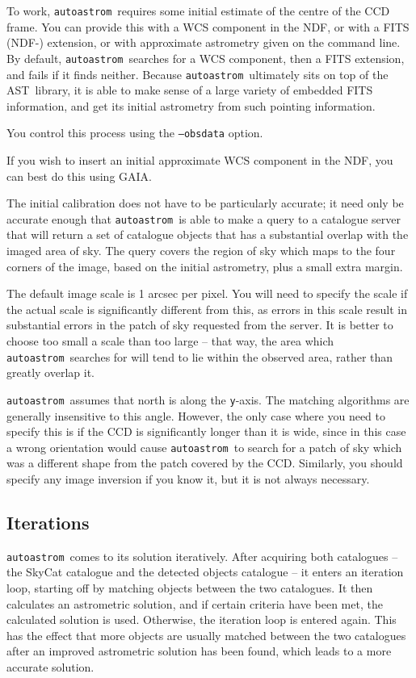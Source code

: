 \documentclass[twoside,11pt]{article}
\newcommand{\xref}[3]{#1}
\newcommand{\xlabel}[1]{}
\newcommand{\AST}{\xref{{\footnotesize AST}}{sun210}{}}
\newcommand{\autoastrom}{\texttt{autoastrom}}
\newcommand{\GAIA}{{\footnotesize GAIA}\normalsize}
\begin{document}
To work, \autoastrom\ requires some initial estimate of the centre of the CCD
frame. You can provide this with a WCS component in the NDF, or with a FITS
(NDF-) extension, or with approximate astrometry given on the command line.
By default, \autoastrom\ searches for a WCS component, then a FITS extension,
and fails if it finds neither.  Because \autoastrom\ ultimately sits on top of
the \AST\ library, it is able to make sense of a large variety of embedded
FITS information, and get its initial astrometry from such pointing
information.

  You control this process using the \texttt{--obsdata} option.

  If you wish to insert an initial approximate WCS component in the NDF, you
  can best do this using \GAIA.

  The initial calibration does not have to be particularly accurate; it need
  only be accurate enough that \autoastrom\ is able to make a query to a
  catalogue server that will return a set of catalogue objects that has a
  substantial overlap with the imaged area of sky.  The query covers the
  region of sky which maps to the four corners of the image, based on the
  initial astrometry, plus a small extra margin.

  The default image scale is 1 arcsec per pixel.  You will need to specify the
  scale if the actual scale is significantly different from this, as errors in
  this scale result in substantial errors in the patch of sky requested from
  the server.  It is better to choose too small a scale than too large -- that
  way, the area which \autoastrom\ searches for will tend to lie within the
  observed area, rather than greatly overlap it.

  \autoastrom\ assumes that north is along the \texttt{y}-axis.  The matching
  algorithms are generally insensitive to this angle.  However, the only case
  where you need to specify this is if the CCD is significantly longer than it
  is wide, since in this case a wrong orientation would cause \autoastrom\ to
  search for a patch of sky which was a different shape from the patch covered
  by the CCD.  Similarly, you should specify any image inversion if you know
  it, but it is not always necessary.

\subsection{\xlabel{sb_iterations}Iterations\label{sb:iterations}}

\autoastrom\ comes to its solution iteratively. After acquiring both
catalogues -- the SkyCat catalogue and the detected objects catalogue -- it
enters an iteration loop, starting off by matching objects between the two
catalogues. It then calculates an astrometric solution, and if certain
criteria have been met, the calculated solution is used. Otherwise, the
iteration loop is entered again. This has the effect that more objects are
usually matched between the two catalogues after an improved astrometric
solution has been found, which leads to a more accurate solution.
\end{document}
